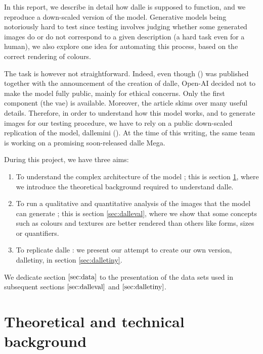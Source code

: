 \documentclass{article}
\begin{document}
\begin{multicols}{2}
In this report, we describe in detail how \gls{dalle} is supposed to function, and we reproduce a down-scaled version of the model. Generative models being notoriously hard to test since testing involves judging whether some generated images do or do not correspond to a given description (a hard task even for a human), we also explore one idea for automating this process, based on the correct rendering of colours.

The task is however not straightforward. Indeed, even though  (\cite{zeroshot}) was published together with the announcement of the creation of \gls{dalle}, Open-AI decided not to make the model fully public, mainly for ethical concerns. Only the first component (the \gls{vae}) is available. Moreover, the article skims over many useful details. Therefore, in order to understand how this model works, and to generate images for our testing procedure, we have to rely on a public down-scaled replication of the model, \gls{dallemini} (\cite{wandbdallemini, dalleminigit}). At the time of this writing, the same team is working on a promising soon-released \gls{dalle} Mega.

During this project, we have three aims:
\begin{enumerate}
    \item To understand the complex architecture of the model ; this is section \ref{sec:theory}, where we introduce the theoretical background required to understand \gls{dalle}.
    \item To run a qualitative and quantitative analysis of the images that the model can generate ; this is section \ref{sec:dalleval}, where we show that some concepts such as colours and textures are better rendered than others like forms, sizes or quantifiers.
    \item To replicate \gls{dalle} : we present our attempt to create our own version, \gls{dalletiny}, in section \ref{sec:dalletiny}.
\end{enumerate}

We dedicate section $\ref{sec:data}$ to the presentation of the data sets used in subsequent sections $\ref{sec:dalleval}$ and $\ref{sec:dalletiny}$.

\end{multicols}

\pagebreak

\section{Theoretical and technical background} \label{sec:theory}
\end{document}
